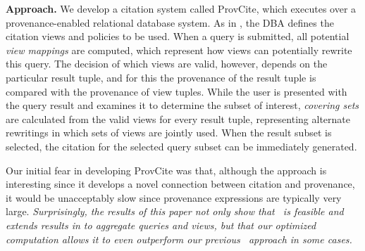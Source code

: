 
\textbf{Approach.} We develop a citation system called ProvCite, which executes over a provenance-enabled relational database system.  %
As in \cite{wu2018data}, the DBA defines the citation views and policies to be used.  When a query is submitted, all potential {\em view mappings} are computed, which represent how views can potentially rewrite this query.  The decision of which views are valid, however, depends on the particular result tuple, and for this the provenance of the result tuple is compared with the provenance of view tuples. While the user is presented with the query result and examines it to determine the subset of interest, \textit{covering sets} are calculated from the valid views for every result tuple, representing alternate rewritings in which sets of views are jointly used. When the result subset is selected, the citation for the selected query subset can be immediately generated.   

Our initial fear in developing ProvCite was that, although the approach is interesting since it develops a novel connection between citation and provenance, it would be unacceptably slow since provenance expressions are typically very large. \textit{Surprisingly, the results of this paper not only show that \pba\ is feasible and extends results in \cite{wu2018data} to aggregate queries and views, but that our optimized computation allows it to even outperform our previous \rba\ approach in some cases.} 

